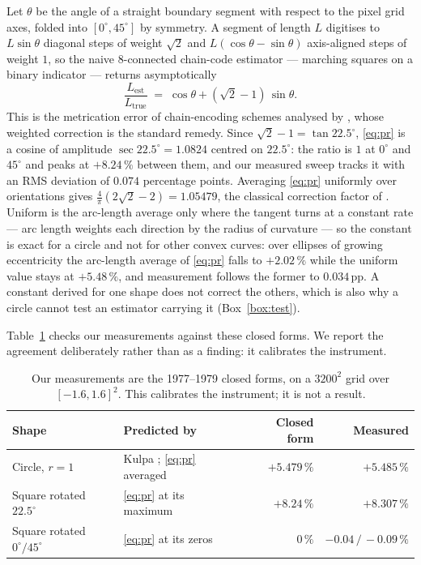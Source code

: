 \documentclass{article}
\newcommand{\pct}[1]{$#1\,\%$}
\begin{document}
Let $\theta$ be the angle of a straight boundary segment with respect to the pixel grid
axes, folded into $[0^\circ,45^\circ]$ by symmetry. A segment of length $L$ digitises to $L\sin\theta$
diagonal steps of weight $\sqrt2$ and $L(\cos\theta-\sin\theta)$ axis-aligned steps of weight $1$,
so the naive $8$-connected chain-code estimator --- marching squares on a binary indicator ---
returns asymptotically
\begin{equation}
  \frac{L_{\text{est}}}{L_{\text{true}}} \;=\; \cos\theta + (\sqrt{2}-1)\,\sin\theta .
  \label{eq:pr}
\end{equation}
This is the metrication error of chain-encoding schemes analysed by \citet{proffitt1979}, whose
weighted correction is the standard remedy. Since $\sqrt2-1 = \tan 22.5^\circ$, \eqref{eq:pr} is a
cosine of amplitude
$\sec 22.5^\circ = 1.0824$ centred on $22.5^\circ$: the ratio is $1$ at $0^\circ$ and $45^\circ$
and peaks at \pct{+8.24} between them, and our measured sweep tracks it with an RMS deviation of
$0.074$ percentage points. Averaging \eqref{eq:pr} uniformly over orientations gives
$\tfrac{4}{\pi}(2\sqrt2-2) = 1.05479$, the classical correction factor of \citet{kulpa1977}.
Uniform is the arc-length average only where the tangent turns at a constant rate --- arc length
weights each direction by the radius of curvature --- so the constant is exact for a circle and not
for other convex curves: over ellipses of growing eccentricity the arc-length average of
\eqref{eq:pr} falls to \pct{+2.02} while the uniform value stays at \pct{+5.48}, and measurement
follows the former to $0.034$\,pp. A constant derived for one shape does not correct the others,
which is also why a circle cannot test an estimator carrying it (Box~\ref{box:test}).

Table~\ref{tab:closed} checks our measurements against these closed forms. We report the agreement
deliberately rather than as a finding: it calibrates the instrument.

\begin{table}[htbp]
\centering
\caption{Our measurements are the 1977--1979 closed forms, on a $3200^2$ grid over
$[-1.6,1.6]^2$. This calibrates the instrument; it is not a result.}
\label{tab:closed}
\small
\begin{tabular}{llrr}
\toprule
Shape & Predicted by & Closed form & Measured \\
\midrule
Circle, $r=1$                     & Kulpa \citeyearpar{kulpa1977}; \eqref{eq:pr} averaged & $+5.479\,\%$ & $+5.485\,\%$ \\
Square rotated $22.5^\circ$       & \eqref{eq:pr} at its maximum                          & $+8.24\,\%$  & $+8.307\,\%$ \\
Square rotated $0^\circ/45^\circ$ & \eqref{eq:pr} at its zeros                            & $0\,\%$      & $-0.04\,/\,-0.09\,\%$ \\
\bottomrule
\end{tabular}
\end{table}
\end{document}
